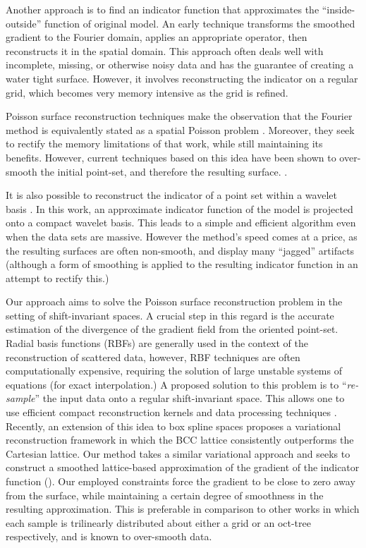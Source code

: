 Another approach is to find an indicator function that approximates the
``inside-outside'' function of original model. An early technique \cite{fftk} 
transforms the smoothed gradient to the Fourier domain, applies an appropriate 
operator, then reconstructs it in the spatial domain. This approach often deals well with
incomplete, missing, or otherwise noisy data and has the guarantee of
creating a water tight surface. However, it involves reconstructing
the indicator on a regular grid, which becomes very memory intensive
as the grid is refined.

Poisson surface reconstruction techniques make the observation that
the Fourier method is equivalently stated as a spatial Poisson problem
\cite{Kazhdan06,screenedk}. Moreover, they seek to rectify the memory
limitations of that work, while still maintaining its benefits. However, 
current techniques based on this idea have been shown to over-smooth 
the initial point-set, and therefore the resulting surface. \cite{reconbench}.

It is also possible to reconstruct the indicator of a point set within
a wavelet basis \cite{wavelet}. In this work, an approximate indicator
function of the model is projected onto a compact wavelet basis. This
leads to a simple and efficient algorithm even when the data sets
are massive. However the method's speed comes at a price, as the
resulting surfaces are often non-smooth, and display many ``jagged''
artifacts (although a form of smoothing is applied to the resulting
indicator function in an attempt to rectify this.)

Our approach aims to solve the Poisson surface reconstruction problem
in the setting of shift-invariant spaces. A crucial step in this
regard is the accurate estimation of the divergence of the gradient
field from the oriented point-set. Radial basis functions (RBFs) are
generally used in the context of the reconstruction of scattered data, 
however, RBF techniques are often computationally
expensive, requiring the solution of large unstable systems of
equations (for exact interpolation.) A proposed solution to this
problem is to ``\emph{re-sample}'' the input data onto a regular
shift-invariant space. This allows one to use efficient compact
reconstruction kernels and data processing techniques
\cite{variational,onvari}. Recently, an extension of this idea to box
spline spaces \cite{xu2012rec} proposes a variational reconstruction
framework in which the BCC lattice consistently outperforms the
Cartesian lattice. Our method takes a similar variational approach and
seeks to construct a smoothed lattice-based approximation of the
gradient of the indicator function (). Our employed
constraints force the gradient to be close to zero away from the
surface, while maintaining a certain degree of smoothness in the
resulting approximation. This is preferable in comparison to other
works \cite{fftk,Kazhdan06,screenedk} in which each sample is
trilinearly distributed about either a grid or an oct-tree
respectively, and is known to over-smooth data.

